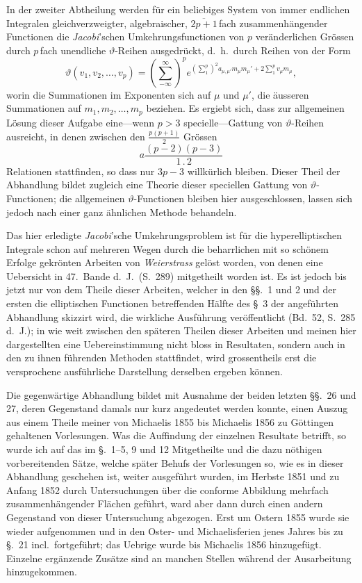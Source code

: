 \documentclass[a4paper,12pt,leqno]{article}
\begin{document}
In der zweiter Abtheilung werden f\"{u}r ein beliebiges System
von immer endlichen Integralen gleichverzweigter, algebraischer,
$\overline{2p + 1} \,$\-fach zusammenh\"{a}ngender Functionen die
\emph{Jacobi}'schen Umkehrungsfunctionen von $p$
ver\"{a}nderlichen Gr\"{o}ssen durch $p \,$\-fach unendliche
$\vartheta$-Reihen ausgedr\"{u}ckt, d.~h.\ durch Reihen von der
Form
\[ \vartheta(v_1, v_2,\ldots, v_p)
   = \left( \sum_{-\infty}^\infty \right)^p
      e^{\left( \sum\limits_1^p \right)^2
               a_{\mu, \mu'} m_\mu m_\mu'
         + 2 \sum\limits_1^p v_\mu m_\mu},\]
worin die Summationen im Exponenten sich auf $\mu$ und $\mu'$,
die \"{a}usseren Summationen auf $m_1, m_2,\ldots, m_p$ beziehen.
Es ergiebt sich, dass zur allgemeinen L\"{o}sung dieser Aufgabe
eine---wenn $p > 3$ specielle---Gattung von $\vartheta$-Reihen
ausreicht, in denen zwischen den
$\displaystyle \frac{p(p + 1)}{2}$
Gr\"{o}ssen
\[ \displaystyle a \frac{(p - 2)(p - 3)}{1 \mathbin{.} 2} \]
Relationen stattfinden, so dass nur $3p - 3$ willk\"{u}rlich
bleiben.  Dieser Theil der Abhandlung bildet zugleich eine
Theorie dieser speciellen Gattung von $\vartheta$-Functionen; die
allgemeinen $\vartheta$-Functionen bleiben hier ausgeschlossen,
lassen sich jedoch nach einer ganz \"{a}hnlichen Methode
behandeln.

Das hier erledigte \emph{Jacobi}'sche Umkehrungsproblem ist
f\"{u}r die hyperelliptischen Integrale schon auf mehreren Wegen
durch die beharrlichen mit so sch\"{o}nem Erfolge gekr\"{o}nten
Arbeiten von \emph{Weierstrass} gel\"{o}st worden, von denen
eine Uebersicht in 47.~Bande d.~J.\ (S.~289)
mitgetheilt worden ist.  Es ist jedoch bis jetzt nur von
dem Theile dieser Arbeiten, welcher in den \S\S.~1 und 2 und der
ersten die elliptischen Functionen betreffenden H\"{a}lfte des
\S~3 der angef\"{u}hrten Abhandlung skizzirt wird, die wirkliche
Ausf\"{u}hrung ver\"{o}ffentlicht
(Bd.~52, S.~285 d.~J.);
in wie weit zwischen den sp\"{a}teren Theilen dieser Arbeiten und
meinen hier dargestellten eine Uebereinstimmung nicht bloss in
Resultaten, sondern auch in den zu ihnen f\"{u}hrenden Methoden
stattfindet, wird grossentheils erst die versprochene
ausf\"{u}hrliche Darstellung derselben ergeben k\"{o}nnen.

Die gegenw\"{a}rtige Abhandlung bildet mit Ausnahme der beiden
letzten \S\S.~26 und 27, deren Gegenstand damals nur kurz
angedeutet werden konnte, einen Auszug aus einem Theile meiner
von Michaelis 1855 bis Michaelis 1856 zu G\"{o}ttingen gehaltenen
Vorlesungen.  Was die Auffindung der einzelnen Resultate
betrifft, so wurde ich auf das im \S.~1--5, 9 und 12 Mitgetheilte
und die dazu n\"{o}thigen vorbereitenden S\"{a}tze, welche
sp\"{a}ter Behufs der Vorlesungen so, wie es in dieser Abhandlung
geschehen ist, weiter ausgef\"{u}hrt wurden, im Herbste 1851 und
zu Anfang 1852 durch Untersuchungen \"{u}ber die conforme
Abbildung mehrfach zusammenh\"{a}ngender Fl\"{a}chen gef\"{u}hrt,
ward aber dann durch einen andern Gegenstand von dieser
Untersuchung abgezogen.  Erst um Ostern 1855 wurde sie wieder
aufgenommen und in den Oster- und Michaelisferien jenes Jahres
bis zu \S.~21 incl.\ fortgef\"{u}hrt; das Uebrige wurde bis
Michaelis 1856 hinzugef\"{u}gt.  Einzelne erg\"{a}nzende
Zus\"{a}tze sind an manchen Stellen w\"{a}hrend der Ausarbeitung
hinzugekommen.
\end{document}
